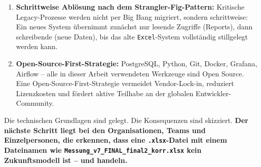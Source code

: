 \documentclass[12pt,a4paper]{report}
\theoremstyle{definition}
\theoremstyle{remark}
\newcommand{\excel}{\texttt{Excel}}
\newcommand{\code}[1]{\texttt{#1}}
\begin{document}
\begin{enumerate}[leftmargin=1.5em, itemsep=5pt]
  \item \textbf{Schrittweise Ablösung nach dem Strangler-Fig-Pattern:}
        Kritische Legacy-Prozesse werden nicht per Big Bang migriert,
        sondern schrittweise: Ein neues System übernimmt zunächst nur
        lesende Zugriffe (Reports), dann schreibende (neue Daten),
        bis das alte \excel-System vollständig stillgelegt werden kann.

  \item \textbf{Open-Source-First-Strategie:}
        PostgreSQL, Python, Git, Docker, Grafana, Airflow --
        alle in dieser Arbeit verwendeten Werkzeuge sind Open Source.
        Eine Open-Source-First-Strategie vermeidet Vendor-Lock-in,
        reduziert Lizenzkosten und fördert aktive Teilhabe an der
        globalen Entwickler-Community.
\end{enumerate}

Die technischen Grundlagen sind gelegt. Die Konsequenzen sind skizziert.
\textbf{Der nächste Schritt liegt bei den Organisationen, Teams und
Einzelpersonen, die erkennen, dass eine \code{.xlsx}-Datei mit einem
Dateinamen wie \code{Messung\_v7\_FINAL\_final2\_korr\newline .xlsx} kein
Zukunftsmodell ist -- und handeln.}
\end{document}
